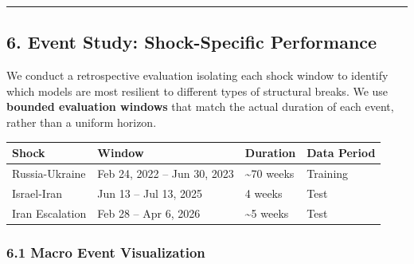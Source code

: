 \documentclass[
]{article}
\begin{document}
\begin{center}\rule{0.5\linewidth}{0.5pt}\end{center}

\subsection{6. Event Study: Shock-Specific
Performance}\label{event-study-shock-specific-performance}

We conduct a retrospective evaluation isolating each shock window to
identify which models are most resilient to different types of
structural breaks. We use \textbf{bounded evaluation windows} that match
the actual duration of each event, rather than a uniform horizon.

\begin{longtable}[]{@{}llll@{}}
\toprule\noalign{}
Shock & Window & Duration & Data Period \\
\midrule\noalign{}
\endhead
\bottomrule\noalign{}
\endlastfoot
Russia-Ukraine & Feb 24, 2022 -- Jun 30, 2023 & \textasciitilde70 weeks
& Training \\
Israel-Iran & Jun 13 -- Jul 13, 2025 & 4 weeks & Test \\
Iran Escalation & Feb 28 -- Apr 6, 2026 & \textasciitilde5 weeks &
Test \\
\end{longtable}

\subsubsection{6.1 Macro Event
Visualization}\label{macro-event-visualization}
\end{document}
